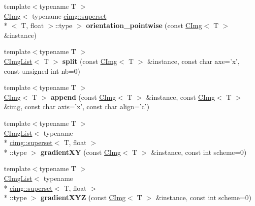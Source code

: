\begin{DoxyCompactItemize}
\item 
\hypertarget{namespacecimg__library_a353d5741067aa871f8e72cca52a23828}{{\footnotesize template$<$typename T $>$ }\\\hyperlink{structcimg__library_1_1_c_img}{C\-Img}$<$ typename \hyperlink{structcimg__library_1_1cimg_1_1superset}{cimg\-::superset}\\*
$<$ T, float $>$\-::type $>$ {\bfseries orientation\-\_\-pointwise} (const \hyperlink{structcimg__library_1_1_c_img}{C\-Img}$<$ T $>$ \&instance)}\label{namespacecimg__library_a353d5741067aa871f8e72cca52a23828}

\item 
\hypertarget{namespacecimg__library_a091dfdcb6bc5c8b7db00fdae5ba2f3af}{{\footnotesize template$<$typename T $>$ }\\\hyperlink{structcimg__library_1_1_c_img_list}{C\-Img\-List}$<$ T $>$ {\bfseries split} (const \hyperlink{structcimg__library_1_1_c_img}{C\-Img}$<$ T $>$ \&instance, const char axe='x', const unsigned int nb=0)}\label{namespacecimg__library_a091dfdcb6bc5c8b7db00fdae5ba2f3af}

\item 
\hypertarget{namespacecimg__library_a4ea7d286ae4230994a18e24fcb42ad8d}{{\footnotesize template$<$typename T $>$ }\\\hyperlink{structcimg__library_1_1_c_img}{C\-Img}$<$ T $>$ {\bfseries append} (const \hyperlink{structcimg__library_1_1_c_img}{C\-Img}$<$ T $>$ \&instance, const \hyperlink{structcimg__library_1_1_c_img}{C\-Img}$<$ T $>$ \&img, const char axis='x', const char align='c')}\label{namespacecimg__library_a4ea7d286ae4230994a18e24fcb42ad8d}

\item 
\hypertarget{namespacecimg__library_a528678297a980588f8b71b1b146999b5}{{\footnotesize template$<$typename T $>$ }\\\hyperlink{structcimg__library_1_1_c_img_list}{C\-Img\-List}$<$ typename \\*
\hyperlink{structcimg__library_1_1cimg_1_1superset}{cimg\-::superset}$<$ T, float $>$\\*
\-::type $>$ {\bfseries gradient\-X\-Y} (const \hyperlink{structcimg__library_1_1_c_img}{C\-Img}$<$ T $>$ \&instance, const int scheme=0)}\label{namespacecimg__library_a528678297a980588f8b71b1b146999b5}

\item 
\hypertarget{namespacecimg__library_a5630548410a647f8ca938769b517a444}{{\footnotesize template$<$typename T $>$ }\\\hyperlink{structcimg__library_1_1_c_img_list}{C\-Img\-List}$<$ typename \\*
\hyperlink{structcimg__library_1_1cimg_1_1superset}{cimg\-::superset}$<$ T, float $>$\\*
\-::type $>$ {\bfseries gradient\-X\-Y\-Z} (const \hyperlink{structcimg__library_1_1_c_img}{C\-Img}$<$ T $>$ \&instance, const int scheme=0)}\label{namespacecimg__library_a5630548410a647f8ca938769b517a444}


\end{DoxyCompactItemize}
